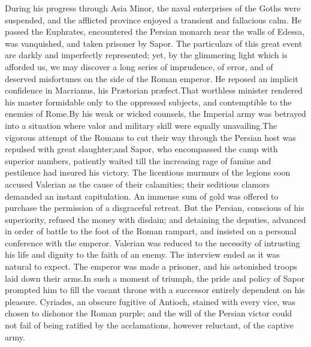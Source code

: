 During his progress through Asia Minor, the naval enterprises of
the Goths were suspended, and the afflicted province enjoyed a
transient and fallacious calm. He passed the Euphrates,
encountered the Persian monarch near the walls of Edessa, was
vanquished, and taken prisoner by Sapor. The particulars of this
great event are darkly and imperfectly represented; yet, by the
glimmering light which is afforded us, we may discover a long
series of imprudence, of error, and of deserved misfortunes on
the side of the Roman emperor. He reposed an implicit confidence
in Macrianus, his Prætorian præfect.\footnotemark[135] That worthless minister
rendered his master formidable only to the oppressed subjects,
and contemptible to the enemies of Rome.\footnotemark[136] By his weak or
wicked counsels, the Imperial army was betrayed into a situation
where valor and military skill were equally unavailing.\footnotemark[137] The
vigorous attempt of the Romans to cut their way through the
Persian host was repulsed with great slaughter;\footnotemark[138] and Sapor,
who encompassed the camp with superior numbers, patiently waited
till the increasing rage of famine and pestilence had insured his
victory. The licentious murmurs of the legions soon accused
Valerian as the cause of their calamities; their seditious
clamors demanded an instant capitulation. An immense sum of gold
was offered to purchase the permission of a disgraceful retreat.
But the Persian, conscious of his superiority, refused the money
with disdain; and detaining the deputies, advanced in order of
battle to the foot of the Roman rampart, and insisted on a
personal conference with the emperor. Valerian was reduced to the
necessity of intrusting his life and dignity to the faith of an
enemy. The interview ended as it was natural to expect. The
emperor was made a prisoner, and his astonished troops laid down
their arms.\footnotemark[139] In such a moment of triumph, the pride and policy
of Sapor prompted him to fill the vacant throne with a successor
entirely dependent on his pleasure. Cyriades, an obscure fugitive
of Antioch, stained with every vice, was chosen to dishonor the
Roman purple; and the will of the Persian victor could not fail
of being ratified by the acclamations, however reluctant, of the
captive army.\footnotemark[140]




